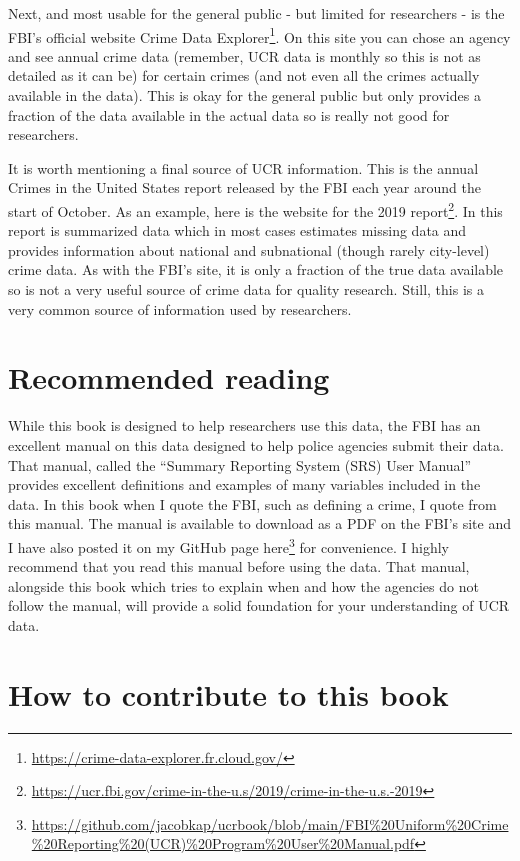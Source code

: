 \documentclass[
]{krantz}
\renewcommand{\href}[2]{#2\footnote{\url{#1}}}
\begin{document}
Next, and most usable for the general public - but limited
for researchers - is the FBI's official website
\href{https://crime-data-explorer.fr.cloud.gov/}{Crime Data
Explorer}. On this site you can chose an agency and see
annual crime data (remember, UCR data is monthly so this is
not as detailed as it can be) for certain crimes (and not
even all the crimes actually available in the data). This is
okay for the general public but only provides a fraction of
the data available in the actual data so is really not good
for researchers.

It is worth mentioning a final source of UCR information.
This is the annual Crimes in the United States report
released by the FBI each year around the start of October.
As an example, here is the
\href{https://ucr.fbi.gov/crime-in-the-u.s/2019/crime-in-the-u.s.-2019}{website
for the 2019 report}. In this report is summarized data
which in most cases estimates missing data and provides
information about national and subnational (though rarely
city-level) crime data. As with the FBI's site, it is only a
fraction of the true data available so is not a very useful
source of crime data for quality research. Still, this is a
very common source of information used by researchers.

\section{Recommended reading}\label{recommended-reading}

While this book is designed to help researchers use this
data, the FBI has an excellent manual on this data designed
to help police agencies submit their data. That manual,
called the ``Summary Reporting System (SRS) User Manual''
provides excellent definitions and examples of many
variables included in the data. In this book when I quote
the FBI, such as defining a crime, I quote from this manual.
The manual is available to download as a PDF on the FBI's
site and I have also posted it on my GitHub page
\href{https://github.com/jacobkap/ucrbook/blob/main/FBI\%20Uniform\%20Crime\%20Reporting\%20(UCR)\%20Program\%20User\%20Manual.pdf}{here}
for convenience. I highly recommend that you read this
manual before using the data. That manual, alongside this
book which tries to explain when and how the agencies do not
follow the manual, will provide a solid foundation for your
understanding of UCR data.

\section{How to contribute to this
book}\label{how-to-contribute-to-this-book}
\end{document}
